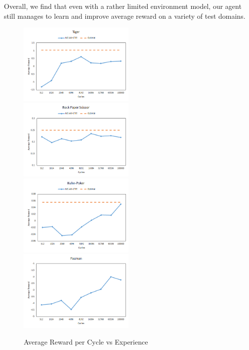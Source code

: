 \documentclass[paper=a4, fontsize=11pt]{scrartcl} %
\numberwithin{equation}{section} %
\numberwithin{figure}{section} %
\numberwithin{table}{section} %
\begin{document}
Overall, we find that even with a rather limited environment model, our agent still manages to learn and improve average reward on a variety of test domains.

\begin{figure}
\includegraphics[width=0.5\textwidth]{plots/tiger}
\includegraphics[width=0.5\textwidth]{plots/rps}
\includegraphics[width=0.5\textwidth]{plots/kpok}
\includegraphics[width=0.5\textwidth]{plots/pacman}
\caption{\label{plot:rewards}Average Reward per Cycle vs Experience}
\end{figure}

\setlength\parindent{0pt}
\end{document}
